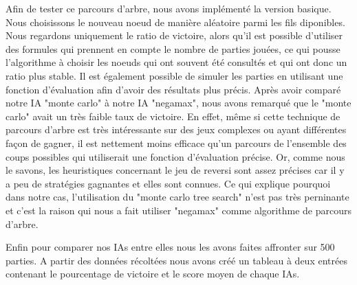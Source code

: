 \documentclass[12pt]{article}
\begin{document}
Afin de tester ce parcours d'arbre, nous avons implémenté la version basique. Nous choisissons le nouveau noeud de manière aléatoire parmi les fils diponibles. Nous regardons uniquement le ratio de victoire, alors qu'il est possible d'utiliser des formules qui prennent en compte le nombre de parties jouées\cite{MonteCarlo}, ce qui pousse l'algorithme à choisir les noeuds qui ont souvent été consultés et qui ont donc un ratio plus stable. Il est également possible de simuler les parties en utilisant une fonction d'évaluation afin d'avoir des résultats plus précis.
Après avoir comparé notre IA "monte carlo" à notre IA "negamax", nous avons remarqué que le "monte carlo" avait un très faible taux de victoire. En effet, même si cette technique de parcours d'arbre est très intéressante sur des jeux complexes ou ayant différentes façon de gagner, il est nettement moins efficace qu'un parcours de l'ensemble des coups possibles qui utiliserait une fonction d'évaluation précise. Or, comme nous le savons, les heuristiques concernant le jeu de reversi sont assez précises car il y a peu de stratégies gagnantes et elles sont connues. Ce qui explique pourquoi dans notre cas, l'utilisation du "monte carlo tree search" n'est pas très perninante et c'est la raison qui nous a fait utiliser "negamax" comme algorithme de parcours d'arbre.


Enfin pour comparer nos IAs entre elles nous les avons faites affronter sur 500 parties. A partir des données récoltées nous avons créé un tableau à deux entrées contenant le pourcentage de victoire et le score moyen de chaque IAs.
\end{document}
